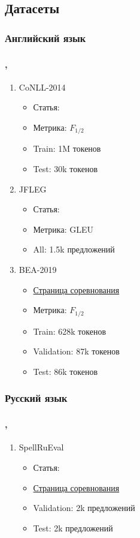 \documentclass[t]{beamer}  %
\begin{document}
\subsection{Датасеты}
\subsubsection{Английский язык}
\begin{frame}
	\frametitle{\insertsection} 
	\framesubtitle{\insertsubsection, \insertsubsubsection}
	\begin{enumerate}
		\item CoNLL-2014
			\begin{itemize}
				\item Статья: \textcite{Ng2013}
				\item Метрика: $F_{1/2}$
				\item Train: 1M токенов
				\item Test: 30k токенов
			\end{itemize}
		\item JFLEG
		\begin{itemize}
			\item Статья: \textcite{Napoles2017}
			\item Метрика: GLEU
			\item All: 1.5k предложений
		\end{itemize}
		\item BEA-2019
		\begin{itemize}
			\item \href{https://www.cl.cam.ac.uk/research/nl/bea2019st/}{Страница соревнования}
			\item Метрика: $F_{1/2}$
			\item Train: 628k токенов
			\item Validation: 87k токенов
			\item Test: 86k токенов
		\end{itemize}
	\end{enumerate}
\end{frame}

\subsubsection{Русский язык}
\begin{frame}
	\frametitle{\insertsection} 
	\framesubtitle{\insertsubsection,  \insertsubsubsection}
	\begin{enumerate}
		\item SpellRuEval
		\begin{itemize}
			\item Статья: \textcite{Sorokin2016a}
			\item \href{http://www.dialog-21.ru/en/evaluation/2016/spelling_correction/}{Страница соревнования}
			\item Validation: 2k предложений
			\item Test: 2k предложений
		\end{itemize}
	\end{enumerate}
\end{frame}
\end{document}

